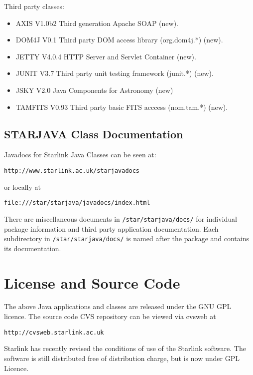 \documentclass[twoside,11pt]{article}
\newcommand{\htmladdnormallink}[2]{#1}
\newcommand{\latex}[1]{#1}
\newcommand{\xlabel}[1]{}
\renewcommand{\_}{\texttt{\symbol{95}}}
\begin{document}
Third party classes:

\begin{itemize}
\item AXIS V1.0b2 Third generation Apache SOAP (new).
\item DOM4J V0.1 Third party DOM access library (org.dom4j.*) (new).
\item JETTY V4.0.4 HTTP Server and Servlet Container (new).
\item JUNIT V3.7 Third party unit testing framework (junit.*) (new).
\item JSKY V2.0 Java Components for Astronomy (new)
\item TAMFITS V0.93 Third party basic FITS acccess (nom.tam.*) (new).
\end{itemize}

\subsection{\label{Javadocs}\xlabel{Javadocs}STARJAVA Class Documentation}

Javadocs for Starlink Java Classes can be seen at:

\htmladdnormallink{\texttt{http://www.starlink.ac.uk/starjavadocs}}{http://www.starlink.ac.uk/starjavadocs}

or locally at

\htmladdnormallink{\texttt{file:///star/starjava/javadocs/index.html}}{file:///star/starjava/javadocs/index.html}

There are miscellaneous documents in \texttt{/star/starjava/docs/} for individual package information and
third party application documentation. Each subdirectory in
\texttt{/star/starjava/docs/} is named after the package and contains its documentation.


\section{\label{license}\xlabel{license}License and Source Code}

The above Java applications and classes are released under the GNU GPL 
licence. The source code CVS repository can be viewed via cvsweb at 

\htmladdnormallink{\texttt{http://cvsweb.starlink.ac.uk}}{http://cvsweb.starlink.ac.uk}

Starlink has recently revised the conditions of use of the Starlink 
software. The software is still distributed free of distribution charge,
but is now under GPL Licence.
\end{document}
